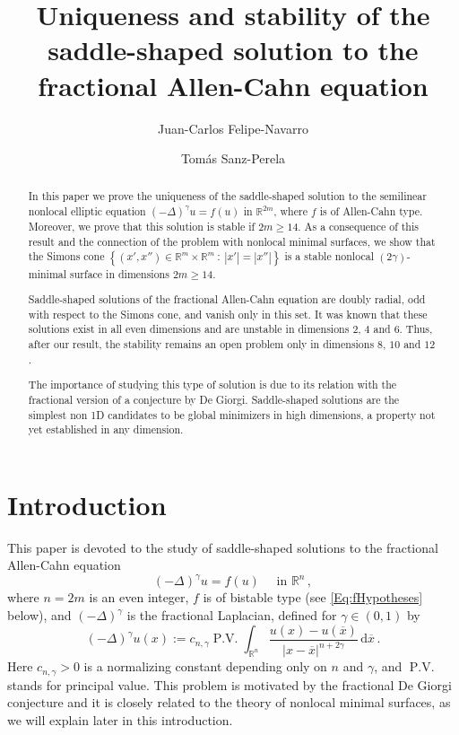 \documentclass[12pt,reqno]{amsart}
\title[Saddle solution to the fractional Allen-Cahn equation]{Uniqueness and stability of the saddle-shaped solution to the fractional Allen-Cahn equation}
\author{Juan-Carlos Felipe-Navarro}
\author{Tomás Sanz-Perela}
\theoremstyle{definition}
\theoremstyle{remark}
\newcommand{\con}[1]{\mathbb{#1}}
\newcommand{\R}{\con{R}} %
\newcommand{\s}{\gamma}
\newcommand{\fraclaplacian}{(-\Delta)^\s}
\renewcommand{\d}{\,\mathrm{d}} %
\newcommand{\setcond}[2]{\left \{ #1 \ : \ #2  \right \}}
\DeclareMathOperator{\PV}{P.V.}
\numberwithin{equation}{section}
\begin{document}
\begin{abstract}
In this paper we prove the uniqueness of the saddle-shaped solution to the semilinear nonlocal elliptic equation $\fraclaplacian u = f(u)$ in $\R^{2m}$, where $f$ is of Allen-Cahn type. Moreover, we prove that this solution is stable if $2m\geq 14$. As a consequence of this result and the connection of the problem with nonlocal minimal surfaces, we show that the Simons cone $\setcond{(x', x'') \in \R^{m}\times \R^m}{|x'| = |x''|}$ is a stable nonlocal $(2\s)$-minimal surface in dimensions $2m\geq 14$.

Saddle-shaped solutions of the fractional Allen-Cahn equation are doubly radial, odd with respect to the Simons cone, and vanish only in this set. It was known that these solutions exist in all even dimensions and are unstable in dimensions $2$, $4$ and $6$. Thus, after our result, the stability remains an open problem only in dimensions $8$, $10$ and $12$.

The importance of studying this type of solution is due to its relation with the fractional version of a conjecture by De Giorgi. Saddle-shaped solutions are the simplest non 1D candidates to be global minimizers in high dimensions, a property not yet established in any dimension.
\end{abstract}


\maketitle




\section{Introduction}

This paper is devoted to the study of saddle-shaped solutions to the fractional Allen-Cahn equation
\begin{equation}
\label{Eq:AllenCahn}
\fraclaplacian u = f(u)  \quad \text{ in } \R^{n}\,,
\end{equation}
where $n=2m$ is an even integer, $f$ is of bistable type (see \eqref{Eq:fHypotheses} below), and $\fraclaplacian$ is the fractional Laplacian, defined for $\s\in(0,1)$ by
$$
\fraclaplacian u (x):= c_{n,\s}  \PV \int_{\R^{n}} \dfrac{u(x) - u(\overline{x})}{|x-\overline{x}|^{n+2\s}} \d \overline{x}\,.
$$
Here $c_{n,\s}>0$ is a normalizing constant depending only on $n$ and $\s$, and $\PV$ stands for principal value. This problem is motivated by the fractional De Giorgi conjecture and it is closely related to the theory of nonlocal minimal surfaces, as we will explain later in this introduction.
\end{document}
